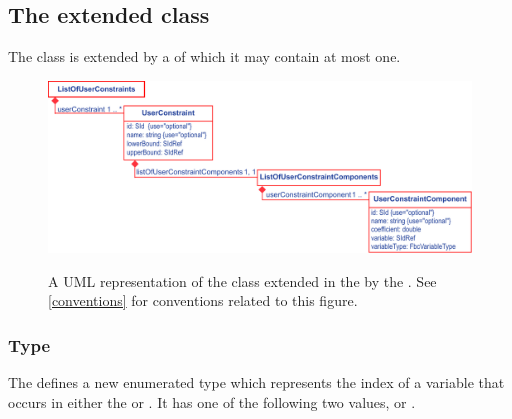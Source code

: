 
\subsection{The extended  class}
\label{model-class-kv}

The \SBML \Model class is extended by a  of which it may contain at most one.
%
\begin{figure}[ht]
  \centering
  \includegraphics[width=\textwidth]{images/fbc_v3_uml_userconstraint.pdf}\\
  \caption{A UML representation of the \SBML \Model class extended in
  the \FBCPackage by the \ListOfUserConstraints. See \ref{conventions} for conventions related to this figure.}
  \label{fig:fbc_v3_uml_user_constraints}
\end{figure}

\subsubsection{Type }
\label{primtype-fbcvariabletype}

The \FBCPackage defines a new enumerated type  which
represents the index of a variable that occurs in either the \FluxObjective or \UserConstraintComponent. It has one of the following two values,  or .


%


